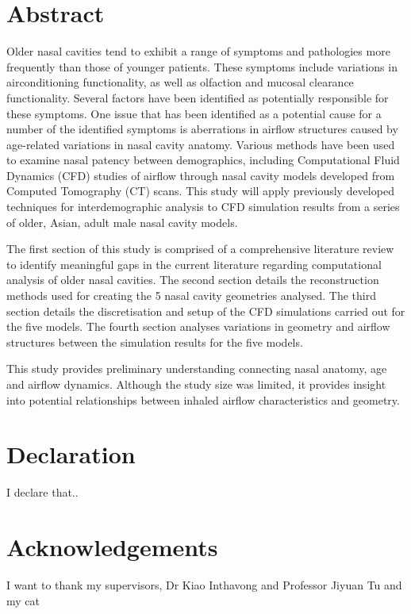 \documentclass[12pt]{report}
\begin{document}
\chapter*{Abstract}
Older nasal cavities tend to exhibit a range of symptoms and pathologies more frequently than those of younger patients. These symptoms include variations in airconditioning functionality, as well as olfaction and mucosal clearance functionality. 
Several factors have been identified as potentially responsible for these symptoms. 
One issue that has been identified as a potential cause for a number of the identified symptoms is aberrations in airflow structures caused by age-related variations in nasal cavity anatomy. 
Various methods have been used to examine nasal patency between demographics, including Computational Fluid Dynamics (CFD) studies of airflow through nasal cavity models developed from Computed Tomography (CT) scans. 
This study will apply previously developed techniques for interdemographic analysis to CFD simulation results from a series of older, Asian, adult male nasal cavity models.

The first section of this study is comprised of a comprehensive literature review to identify meaningful gaps in the current literature regarding computational analysis of older nasal cavities. 
The second section details the reconstruction methods used for creating the 5 nasal cavity geometries analysed.
The third section details the discretisation and setup of the CFD simulations carried out for the five models.
The fourth section analyses variations in geometry and airflow structures between the simulation results for the five models.

This study provides preliminary understanding connecting nasal anatomy, age and airflow dynamics. Although the study size was limited, it provides insight into potential relationships between inhaled airflow characteristics and geometry.
\chapter*{Declaration}
I declare that..

\chapter*{Acknowledgements}
I want to thank my supervisors, Dr Kiao Inthavong and Professor Jiyuan Tu and my cat

\tableofcontents

\newpage
\listoffigures
\listoftables
\end{document}
